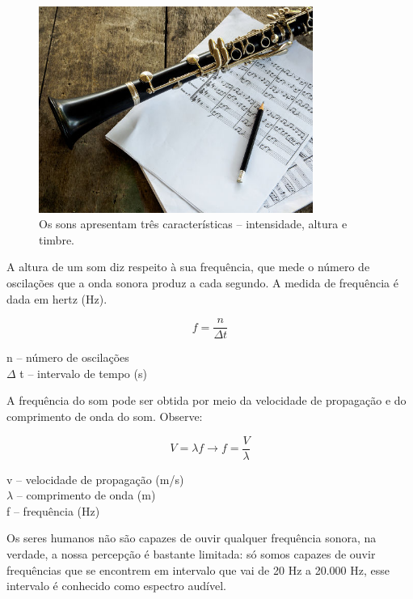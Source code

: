 \documentclass[
	article,		
	11pt,			
	oneside,		
	a4paper,			
	english,			
	brazil			
]{abntex2}
\begin{document}
\begin{figure}[h]
    \includegraphics[width=0.80\textwidth]{caracateristicas-dos-sons.jpg}
    \centering
    \caption{Os sons apresentam três características – intensidade, altura e timbre.}
    \label{fig:CaracteriasticaDoSom}
\end{figure}

A altura de um som diz respeito à sua frequência, que mede o número de oscilações que a onda sonora produz a cada segundo. A medida de frequência é dada em hertz (Hz).

\begin{equation}
    f = \frac{n}{\Delta t}
\end{equation}

\begin{center}
    n – número de oscilações\\
    {$\Delta$} t – intervalo de tempo (s)
\end{center}

A frequência do som pode ser obtida por meio da velocidade de propagação e do comprimento de onda do som. Observe:

\begin{equation}
    V = \lambda f \rightarrow f = \frac{V}{\lambda}
\end{equation}

\begin{center}
    v – velocidade de propagação (m/s)\\
    $\lambda$ – comprimento de onda (m)\\
    f – frequência (Hz)
\end{center}

Os seres humanos não são capazes de ouvir qualquer frequência sonora, na verdade, a nossa percepção é bastante limitada: só somos capazes de ouvir frequências que se encontrem em intervalo que vai de 20 Hz a 20.000 Hz, esse intervalo é conhecido como espectro audível.
\end{document}
